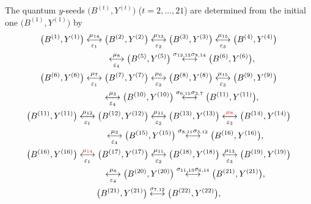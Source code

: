 \documentclass[pdftex]{sigma}
\newcommand\bY{Y}
\numberwithin{equation}{section}
\begin{document}
The quantum $y$-seeds $\bigl(B^{(t)}, \bY^{(t)}\bigr)$ ($t=2,\dotsc, 21$) are
determined from the initial one $\bigl(B^{(1)},\allowbreak \bY^{(1)}\bigr) $ by
\begin{gather}
\bigl(B^{(1)}, \bY^{(1)}\bigr) \underset{\varepsilon_1}{\overset{\mu_{14}}{\longleftrightarrow}}
\bigl(B^{(2)}, \bY^{(2)}\bigr) \underset{\varepsilon_2}{\overset{\mu_{13}}{\longleftrightarrow}}
\bigl(B^{(3)}, \bY^{(3)}\bigr) \underset{\varepsilon_3}{\overset{\mu_{15}}{\longleftrightarrow}}
\bigl(B^{(4)}, \bY^{(4)}\bigr)\nonumber
\\
\phantom{\bigl(B^{(1)}, \bY^{(1)}\bigr)}{}
 \underset{\varepsilon_4}{\overset{\mu_{8}}{\longleftrightarrow}}
\bigl(B^{(5)}, \bY^{(5)}\bigr) \overset{\sigma_{13,15}\sigma_{8,14}}{\longleftrightarrow}
\bigl(B^{(6)}, \bY^{(6)}\bigr),\nonumber
\\
\bigl(B^{(6)}, \bY^{(6)}\bigr) \underset{\varepsilon_1}{\overset{\mu_{7}}{\longleftrightarrow}}
\bigl(B^{(7)}, \bY^{(7)}\bigr) \underset{\varepsilon_2}{\overset{\mu_{6}}{\longleftrightarrow}}
\bigl(B^{(8)}, \bY^{(8)}\bigr) \underset{\varepsilon_3}{\overset{\mu_{15}}{\longleftrightarrow}}
\bigl(B^{(9)}, \bY^{(9)}\bigr)\nonumber
\\
\phantom{\bigl(B^{(6)}, \bY^{(6)}\bigr)}{}
\underset{\varepsilon_4}{\overset{\mu_{3}}{\longleftrightarrow} }
\bigl(B^{(10)}, \bY^{(10)}\bigr) \overset{\sigma_{6,15}\sigma_{3,7}}{\longleftrightarrow}
\bigl(B^{(11)}, \bY^{(11)}\bigr),\nonumber
\\
\bigl(B^{(11)}, \bY^{(11)}\bigr) \underset{\varepsilon_1}{\overset{\mu_{12}}{\longleftrightarrow} }
\bigl(B^{(12)}, \bY^{(12)}\bigr) \underset{\varepsilon_2}{\overset{\mu_{11}}{\longleftrightarrow} }
\bigl(B^{(13)}, \bY^{(13)}\bigr) \underset{\varepsilon_3}{\overset{\begin{color}{red}\mu_{8}\end{color}}{\longleftrightarrow} }
\bigl(B^{(14)}, \bY^{(14)}\bigr)\nonumber
\\
\phantom{\bigl(B^{(11)}, \bY^{(11)}\bigr)}{}
 \underset{\varepsilon_4}{ \overset{\mu_{3}}{\longleftrightarrow}}
\bigl(B^{(15)}, \bY^{(15)}\bigr) \overset{\sigma_{8,11}\sigma_{3,12}}{\longleftrightarrow}
\bigl(B^{(16)}, \bY^{(16)}\bigr),\nonumber
\\
\bigl(B^{(16)}, \bY^{(16)}\bigr) \underset{\varepsilon_1}{\overset{\begin{color}{red}\mu_{14}\end{color}}{\longleftrightarrow}}
\bigl(B^{(17)}, \bY^{(17)}\bigr) \underset{\varepsilon_2}{\overset{\mu_{11}}{\longleftrightarrow}}
\bigl(B^{(18)}, \bY^{(18)}\bigr) \underset{\varepsilon_3}{\overset{\mu_{13}}{\longleftrightarrow}}
\bigl(B^{(19)}, \bY^{(19)}\bigr)\nonumber
\\
\phantom{\bigl(B^{(16)}, \bY^{(16)}\bigr) }{}
\underset{\varepsilon_4}{ \overset{\mu_{6}}{\longleftrightarrow}}
\bigl(B^{(20)}, \bY^{(20)}\bigr) \overset{\sigma_{11,13}\sigma_{6,14}}{\longleftrightarrow}
\bigl(B^{(21)}, \bY^{(21)}\bigr),\nonumber
\\
\bigl(B^{(21)}, \bY^{(21)}\bigr) \overset{\sigma_{7,12}}{\longleftrightarrow}
\bigl(B^{(22)}, \bY^{(22)}\bigr),\label{b21L}
\end{gather}
\end{document}

